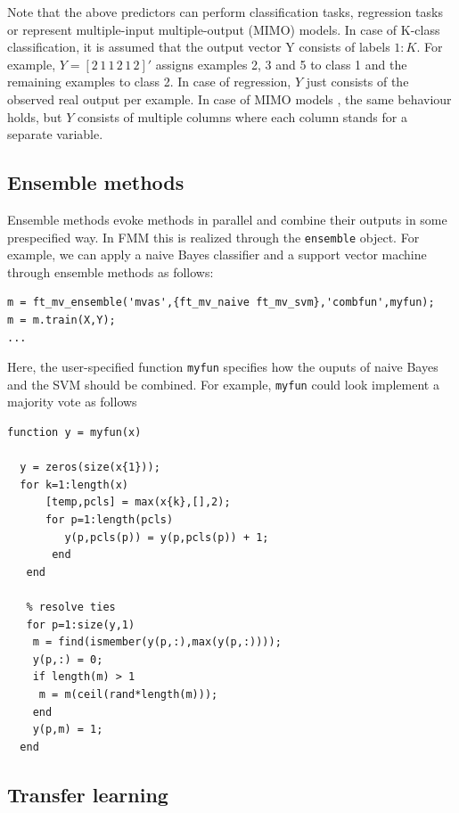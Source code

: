 \documentclass{article}
\renewcommand{\t}[1]{{\tt #1}}
\begin{document}
Note that the above predictors can perform classification tasks, regression tasks or represent multiple-input multiple-output (MIMO) models. In case of K-class classification, it is assumed that the output vector Y consists of labels $1:K$. For example, $Y = [2\,1\, 1\, 2\, 1\, 2]'$ assigns examples 2, 3 and 5 to class 1 and the remaining examples to class 2. In case of regression, $Y$ just consists of the observed real output per example. In case of MIMO models , the same behaviour holds, but $Y$ consists of multiple columns where each column stands for a separate variable.

\subsection{Ensemble methods}

Ensemble methods evoke methods in parallel and combine their outputs in some prespecified way. In FMM this is realized through the \t{ensemble} object. For example, we can apply a naive Bayes classifier and a support vector machine through ensemble methods as follows:
\begin{verbatim}
m = ft_mv_ensemble('mvas',{ft_mv_naive ft_mv_svm},'combfun',myfun);
m = m.train(X,Y);
...
\end{verbatim}
Here, the user-specified function \t{myfun} specifies how the ouputs of naive Bayes and the SVM should be combined. For example, \t{myfun} could look implement a majority vote as follows
\begin{verbatim}
function y = myfun(x)

  y = zeros(size(x{1}));
  for k=1:length(x)
      [temp,pcls] = max(x{k},[],2);
      for p=1:length(pcls)
         y(p,pcls(p)) = y(p,pcls(p)) + 1;
       end
   end
            
   % resolve ties
   for p=1:size(y,1)
    m = find(ismember(y(p,:),max(y(p,:))));
    y(p,:) = 0;
    if length(m) > 1
     m = m(ceil(rand*length(m)));
    end
    y(p,m) = 1;
  end
\end{verbatim}


\subsection{Transfer learning}
\end{document}
